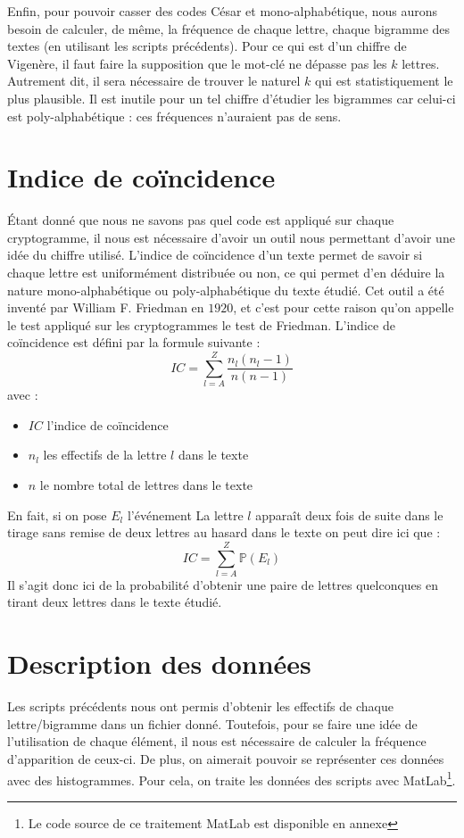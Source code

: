 \documentclass[a4paper, titlepage]{livret}
\begin{document}
Enfin, pour pouvoir \og casser \fg{} des codes César et mono-alphabétique, nous aurons besoin de calculer, de même, la fréquence de chaque lettre, chaque bigramme des textes (en utilisant les scripts précédents).
Pour ce qui est d'un chiffre de Vigenère, il faut faire la supposition que le mot-clé ne dépasse pas les $k$ lettres.
Autrement dit, il sera nécessaire de trouver le naturel $k$ qui est statistiquement le plus plausible.
Il est inutile pour un tel chiffre d'étudier les bigrammes car celui-ci est poly-alphabétique : ces fréquences n'auraient pas de sens.

\section{Indice de coïncidence}
Étant donné que nous ne savons pas quel code est appliqué sur chaque cryptogramme, il nous est nécessaire d'avoir un outil nous permettant d'avoir une idée du chiffre utilisé.
L'indice de coïncidence d'un texte permet de savoir si chaque lettre est uniformément distribuée ou non, ce qui permet d'en déduire la nature mono-alphabétique ou poly-alphabétique du texte étudié.
Cet outil a été inventé par William F. Friedman en $1920$, et c'est pour cette raison qu'on appelle le test appliqué sur les cryptogrammes le test de Friedman.
L'indice de coïncidence est défini par la formule suivante : 
\[ IC = \sum_{l = A}^{Z} \frac{n_{l}(n_{l} - 1)}{n(n-1)} \]
avec :
\begin{itemize}
 \item $IC$ l'indice de coïncidence
 \item $n_{l}$ les effectifs de la lettre $l$ dans le texte
 \item $n$ le nombre total de lettres dans le texte
\end{itemize}

En fait, si on pose $E_{l}$ l'événement \og La lettre $l$ apparaît deux fois de suite dans le tirage sans remise de deux lettres au hasard dans le texte \fg{} on peut dire ici que :
\[ IC = \sum_{l = A}^{Z} \mathbb{P}(E_{l}) \]
Il s'agit donc ici de la probabilité d'obtenir une paire de lettres quelconques en tirant deux lettres dans le texte étudié.

\section{Description des données}
Les scripts précédents nous ont permis d'obtenir les effectifs de chaque lettre/bigramme dans un fichier donné.
Toutefois, pour se faire une idée de l'utilisation de chaque élément, il nous est nécessaire de calculer la fréquence d'apparition de ceux-ci.
De plus, on aimerait pouvoir se représenter ces données avec des histogrammes.
Pour cela, on traite les données des scripts avec MatLab\footnote{Le code source de ce traitement MatLab est disponible en annexe}.
\end{document}
